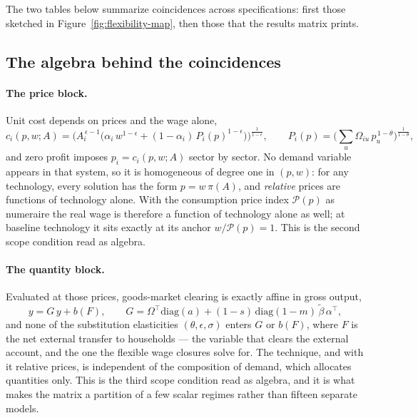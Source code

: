 The two tables below summarize coincidences across specifications: first
those sketched in Figure~\ref{fig:flexibility-map}, then those that the
results matrix prints.




\subsection*{The algebra behind the coincidences}

\paragraph{The price block.} Unit cost depends on prices and the wage alone,
\begin{equation}
c_i(p,w;A) = \Big( A_i^{\,\epsilon-1}\big( \alpha_i\, w^{1-\epsilon}
+ (1-\alpha_i)\, P_i(p)^{1-\epsilon} \big) \Big)^{\frac{1}{1-\epsilon}},
\qquad
P_i(p) = \Big( \textstyle\sum_u \Omega_{iu}\, p_u^{\,1-\theta} \Big)^{\frac{1}{1-\theta}},
\label{eq:appA-cost}
\end{equation}
and zero profit imposes $p_i = c_i(p,w;A)$ sector by sector. No demand
variable appears in that system, so it is homogeneous of degree one in
$(p,w)$: for any technology, every solution has the form $p = w\,\pi(A)$, and
\emph{relative} prices are functions of technology alone. With the
consumption price index $\mathcal{P}(p)$ as numeraire the real wage is therefore a
function of technology alone as well; at baseline technology it sits exactly
at its anchor $w/\mathcal{P}(p) = 1$. This is the second scope condition read as
algebra.

\paragraph{The quantity block.} Evaluated at those prices, goods-market
clearing is exactly affine in gross output,
\begin{equation}
y = G\,y + b(F), \qquad
G = \Omega^{\!\top}\mathrm{diag}(a)
  + (1-s)\,\mathrm{diag}(1-m)\,\tilde\beta\,\alpha^{\!\top},
\label{eq:appA-affine}
\end{equation}
and none of the substitution elasticities $(\theta,\epsilon,\sigma)$ enters
$G$ or $b(F)$, where $F$ is the net external transfer to households --- the
variable that clears the external account, and the one the flexible wage closures
solve for. The technique, and with it relative prices, is independent of the
composition of demand, which allocates quantities only. This is the third
scope condition read as algebra, and it is what makes the matrix a partition
of a few scalar regimes rather than fifteen separate models.

